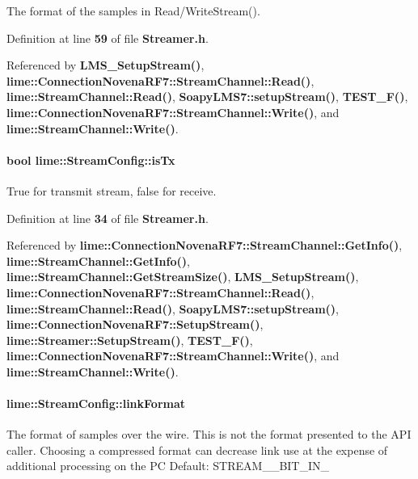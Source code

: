 The format of the samples in Read/\+Write\+Stream(). 



Definition at line {\bf 59} of file {\bf Streamer.\+h}.



Referenced by {\bf L\+M\+S\+\_\+\+Setup\+Stream()}, {\bf lime\+::\+Connection\+Novena\+R\+F7\+::\+Stream\+Channel\+::\+Read()}, {\bf lime\+::\+Stream\+Channel\+::\+Read()}, {\bf Soapy\+L\+M\+S7\+::setup\+Stream()}, {\bf T\+E\+S\+T\+\_\+\+F()}, {\bf lime\+::\+Connection\+Novena\+R\+F7\+::\+Stream\+Channel\+::\+Write()}, and {\bf lime\+::\+Stream\+Channel\+::\+Write()}.

\paragraph[{is\+Tx}]{\setlength{\rightskip}{0pt plus 5cm}bool lime\+::\+Stream\+Config\+::is\+Tx}\label{structlime_1_1StreamConfig_a7b01cb7794601b105df888b2ec44721d}


True for transmit stream, false for receive. 



Definition at line {\bf 34} of file {\bf Streamer.\+h}.



Referenced by {\bf lime\+::\+Connection\+Novena\+R\+F7\+::\+Stream\+Channel\+::\+Get\+Info()}, {\bf lime\+::\+Stream\+Channel\+::\+Get\+Info()}, {\bf lime\+::\+Stream\+Channel\+::\+Get\+Stream\+Size()}, {\bf L\+M\+S\+\_\+\+Setup\+Stream()}, {\bf lime\+::\+Connection\+Novena\+R\+F7\+::\+Stream\+Channel\+::\+Read()}, {\bf lime\+::\+Stream\+Channel\+::\+Read()}, {\bf Soapy\+L\+M\+S7\+::setup\+Stream()}, {\bf lime\+::\+Connection\+Novena\+R\+F7\+::\+Setup\+Stream()}, {\bf lime\+::\+Streamer\+::\+Setup\+Stream()}, {\bf T\+E\+S\+T\+\_\+\+F()}, {\bf lime\+::\+Connection\+Novena\+R\+F7\+::\+Stream\+Channel\+::\+Write()}, and {\bf lime\+::\+Stream\+Channel\+::\+Write()}.

\paragraph[{link\+Format}]{ lime\+::\+Stream\+Config\+::link\+Format}\label{structlime_1_1StreamConfig_aeed3a8d921cc21111a67a723f890dceb}
The format of samples over the wire. This is not the format presented to the A\+PI caller. Choosing a compressed format can decrease link use at the expense of additional processing on the PC Default\+: S\+T\+R\+E\+A\+M\+\_\+\_\+\+B\+I\+T\+\_\+\+I\+N\+\_ 


